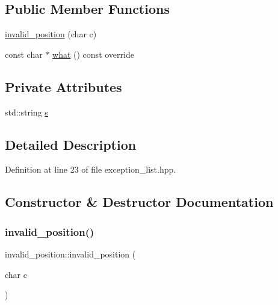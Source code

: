 \subsection*{Public Member Functions}
\begin{DoxyCompactItemize}
\item 
\hyperlink{classinvalid__position_afdef78718233d3cf1f8e77ec0af4963d}{invalid\+\_\+position} (char c)
\item 
const char $\ast$ \hyperlink{classinvalid__position_a06163ba7cde1c818d7fd52b13686aad4}{what} () const override
\end{DoxyCompactItemize}
\subsection*{Private Attributes}
\begin{DoxyCompactItemize}
\item 
std\+::string \hyperlink{classinvalid__position_a583ac2c97b1c840be45d66f39c079082}{s}
\end{DoxyCompactItemize}


\subsection{Detailed Description}


Definition at line 23 of file exception\+\_\+list.\+hpp.



\subsection{Constructor \& Destructor Documentation}
\mbox{\label{classinvalid__position_afdef78718233d3cf1f8e77ec0af4963d}} 
\subsubsection{\texorpdfstring{invalid\+\_\+position()}{invalid\_position()}}
{\footnotesize\ttfamily invalid\+\_\+position\+::invalid\+\_\+position (\begin{DoxyParamCaption}\item[{char}]{c }\end{DoxyParamCaption})\hspace{0.3cm}{\ttfamily [inline]}}



